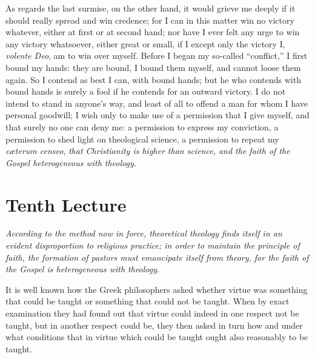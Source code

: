 \documentclass[12pt,a4paper]{book}
\begin{document}
As regards the last surmise, on the other hand, it would grieve me deeply if it should really spread
and win credence; for I can in this matter win no victory whatever, either at first or at second
hand; nor have I ever felt any urge to win any victory whatsoever, either great or small, if I
except only the victory I, \textit{volente Deo}, am to win over myself. Before I began my so-called
``conflict,'' I first bound my hands: they are bound, I bound them myself, and cannot loose them
again. So I contend as best I can, with bound hands; but he who contends with bound hands is surely
a fool if he contends for an outward victory. I do not intend to stand in anyone's way, and least
of all to offend a man for whom I have personal goodwill; I wish only to make use of a permission
that I give myself, and that surely no one can deny me: a permission to express my conviction, a
permission to shed light on theological science, a permission to repeat my \textit{cæterum censeo},
\emph{that Christianity is higher than science, and the faith of the Gospel heterogeneous with
theology.}

\chapter*{Tenth Lecture}
\label{ch:forel10}

\begin{center}\itshape
According to the method now in force, theoretical theology finds itself in
an evident disproportion to religious practice; in order to maintain the
principle of faith, the formation of pastors must emancipate itself from
theory, for the faith of the Gospel is heterogeneous with theology.
\end{center}

It is well known how the Greek philosophers asked whether virtue was something that could be
taught or something that could not be taught. When by exact examination they had found out that
virtue could indeed in one respect not be taught, but in another respect could be, they then
asked in turn how and under what conditions that in virtue which could be taught ought also
reasonably to be taught.
\end{document}
